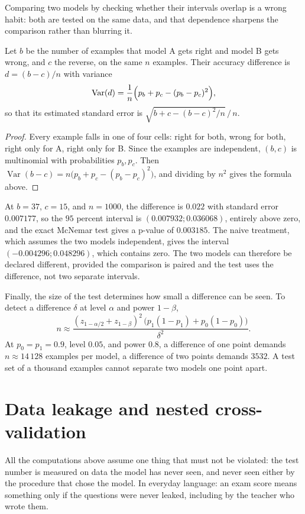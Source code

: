 Comparing two models by checking whether their intervals overlap is a wrong habit: both are tested
on the same data, and that dependence sharpens the comparison rather than blurring it.

\begin{proposisi}
Let $b$ be the number of examples that model A gets right and model B gets wrong, and $c$ the
reverse, on the same $n$ examples. Their accuracy difference is $d=(b-c)/n$ with variance
\[
\operatorname{Var}(d)=\frac{1}{n}\Bigl(p_b+p_c-(p_b-p_c)^2\Bigr),
\]
so that its estimated standard error is $\sqrt{b+c-(b-c)^2/n}\,/\,n$.
\end{proposisi}

\begin{proof}[Proof]
Every example falls in one of four cells: right for both, wrong for both, right only for A, right
only for B. Since the examples are independent, $(b,c)$ is multinomial with probabilities $p_b,p_c$.
Then $\operatorname{Var}(b-c)=n\bigl(p_b+p_c-(p_b-p_c)^2\bigr)$, and dividing by $n^2$ gives the
formula above.
\end{proof}

At $b=37$, $c=15$, and $n=1000$, the difference is $0.022$ with standard error $0.007177$, so the
$95$ percent interval is $(0.007932;0.036068)$, entirely above zero, and the exact McNemar test
gives a p-value of $0.003185$. The naive treatment, which assumes the two models independent, gives
the interval $(-0.004296;0.048296)$, which contains zero. The two models can therefore be declared
different, provided the comparison is paired and the test uses the difference, not two separate
intervals.

Finally, the size of the test determines how small a difference can be seen. To detect a difference
$\delta$ at level $\alpha$ and power $1-\beta$,
\[
n\approx\frac{(z_{1-\alpha/2}+z_{1-\beta})^2\,\bigl(p_1(1-p_1)+p_0(1-p_0)\bigr)}
{\delta^2}.
\]
At $p_0=p_1=0.9$, level $0.05$, and power $0.8$, a difference of one point demands
$n\approx14\,128$ examples per model, a difference of two points demands $3532$. A test set of a
thousand examples cannot separate two models one point apart.

\section{Data leakage and nested cross-validation}

All the computations above assume one thing that must not be violated: the test number is measured
on data the model has never seen, and never seen either by the procedure that chose the model. In
everyday language: an exam score means something only if the questions were never leaked, including
by the teacher who wrote them.

